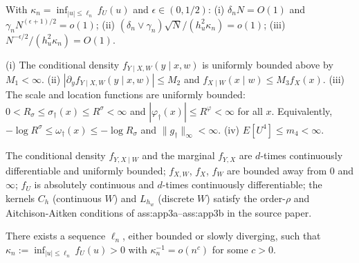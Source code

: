 \begin{assumption}\label{ass:restrvarth}
With $\kappa_n = \inf_{|u|\le \ell_n} f_U(u)$ and $\epsilon \in (0, 1/2)$:
\textup{(i)} $\delta_n N = O(1)$ and $\gamma_n N^{(\epsilon+1)/2} = o(1)$;
\textup{(ii)} $(\delta_n \vee \gamma_n)\sqrt{N}/(h_u^2 \kappa_n) = o(1)$;
\textup{(iii)} $N^{-\epsilon/2}/(h_u^2 \kappa_n) = O(1)$.
\end{assumption}


\begin{assumption}\label{ass:unifbd}
\textup{(i)} The conditional density $f_{Y\mid X,W}(y\mid x,w)$ is uniformly
bounded above by $M_1 < \infty$.
\textup{(ii)} $|\partial_y f_{Y\mid X,W}(y\mid x,w)| \le M_2$ and
$f_{X\mid W}(x\mid w) \le M_3 f_X(x)$.
\textup{(iii)} The scale and location functions are uniformly bounded:
$0 < R_\sigma \le \sigma_\dagger(x) \le R^\sigma < \infty$ and
$|\varphi_\dagger(x)| \le R^\varphi < \infty$ for all $x$. Equivalently,
$-\log R^\sigma \le \omega_\dagger(x) \le -\log R_\sigma$ and
$\|g_\dagger\|_\infty < \infty$.
\textup{(iv)} $E[U^4] \le m_4 < \infty$.
\end{assumption}


\begin{assumption}\label{ass:app1to3}
The conditional density $f_{Y,X\mid W}$ and the marginal $f_{Y,X}$ are
$d$-times continuously differentiable and uniformly bounded; $f_{X,W}$, $f_X$,
$f_W$ are bounded away from $0$ and $\infty$; $f_U$ is absolutely continuous
and $d$-times continuously differentiable; the kernels $C_h$ (continuous $W$)
and $L_{h_w}$ (discrete $W$) satisfy the order-$\rho$ and Aitchison-Aitken
conditions of \textup{ass:app3a}--\textup{ass:app3b} in the source paper.
\end{assumption}

\begin{assumption}\label{ass:app4}
There exists a sequence $\ell_n$, either bounded or slowly diverging,
such that $\kappa_n := \inf_{|u|\le\ell_n} f_U(u) > 0$ with
$\kappa_n^{-1} = o(n^c)$ for some $c > 0$.
\end{assumption}

